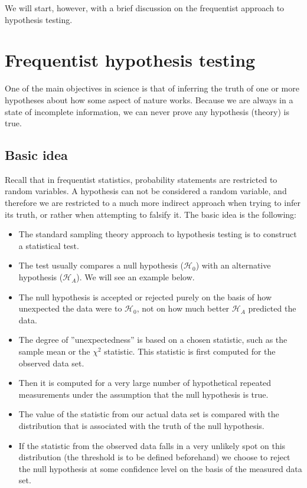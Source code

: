 \documentclass[%
oneside,                 %
final,                   %
10pt]{article}
\begin{document}
We will start, however, with a brief discussion on the frequentist approach to hypothesis testing.

\section{Frequentist hypothesis testing}
One of the main objectives in science is that of inferring the truth of one or more hypotheses about how some aspect of nature works. Because we are always in a state of incomplete information, we can never prove any hypothesis (theory) is true.

\subsection{Basic idea}

Recall that in frequentist statistics, probability statements are restricted to random variables. A hypothesis can not be considered a random variable, and therefore we are restricted to a much more indirect approach when trying to infer its truth, or rather when attempting to falsify it. The basic idea is the following:

\begin{itemize}
\item The standard sampling theory approach to hypothesis testing is to construct a statistical test.

\item The test usually compares a null hypothesis ($\mathcal{H}_0$) with an alternative hypothesis ($\mathcal{H}_A$). We will see an example below.

\item The null hypothesis is accepted or rejected purely on the basis of how unexpected the data were to $\mathcal{H}_0$, not on how much better $\mathcal{H}_A$ predicted the data. 

\item The degree of ''unexpectedness'' is based on a chosen statistic, such as the sample mean or the $\chi^2$ statistic. This statistic is first computed for the observed data set. 

\item Then it is computed for a very large number of hypothetical repeated measurements under the assumption that the null hypothesis is true. 

\item The value of the statistic from our actual data set is compared with the distribution that is associated with the truth of the null hypothesis.

\item If the statistic from the observed data falls in a very unlikely spot on this distribution (the threshold is to be defined beforehand) we choose to reject the null hypothesis at some confidence level on the basis of the measured data set. 
\end{itemize}
\end{document}
